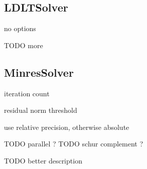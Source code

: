 \subsection{LDLTSolver}

no options 

TODO more

\subsection{MinresSolver}


iteration count


residual norm threshold


use relative precision, otherwise absolute


TODO parallel ?
TODO schur complement ?

TODO better description

